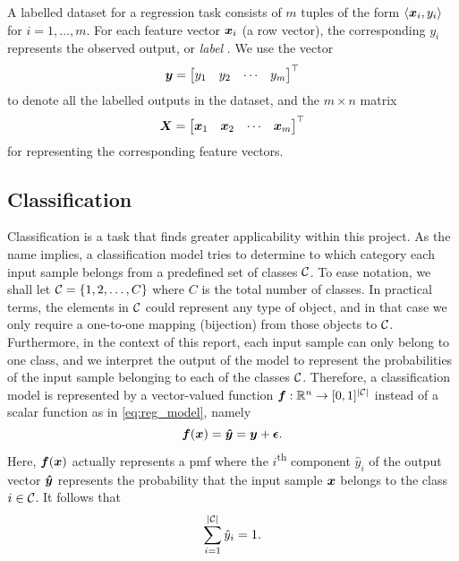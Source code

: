 \documentclass[../report.tex]{subfiles}
\begin{document}
A labelled dataset for a regression task consists of $m$ tuples of the form
$\langle {\bm{x}}_i, y_i\rangle$
for $i=1,\dots,m$.
For each feature vector ${\bm{x}}_i$ (a row vector), the corresponding $y_i$ represents the observed output, or \emph{label} \cite{burkov2019}.
We use the vector
\begin{equation}
    \label{eq:sup_learn_target}
    {\bm{y}} = \begin{bmatrix}
        y_1 & y_2 & \cdots & y_m
    \end{bmatrix}^\top
\end{equation}
to denote all the labelled outputs in the dataset, and the $m \times n$ matrix
\begin{equation}
    \label{eq:sup_learn_input_matrix}
    {\bm{X}} = \begin{bmatrix}
        {\bm{x}}_1 & {\bm{x}}_2 & \cdots & {\bm{x}}_m
    \end{bmatrix}^\top
\end{equation}
for representing the corresponding feature vectors.

\subsection{Classification}
\label{sec:background_classification}
Classification is a task that finds greater applicability within this project.
As the name implies, a classification model tries to determine to which category each input sample belongs from a predefined set of classes ${\mathcal{C}}$.
To ease notation, we shall let ${\mathcal{C}}=\{1, 2, \dots, C\}$ where $C$ is the total number of classes.
In practical terms, the elements in ${\mathcal{C}}$ could represent any type of object, and in that case we only require a one-to-one mapping (bijection) from those objects to ${\mathcal{C}}$.
Furthermore, in the context of this report, each input sample can only belong to one class, and we interpret the output of the model to represent the probabilities of the input sample belonging to each of the classes ${\mathcal{C}}$.
Therefore, a classification model is represented by a vector-valued function
${\bm{f}} : \mathbb{R}^n \rightarrow [0,1]^{\lvert{\mathcal{C}}\rvert}$
instead of a scalar function as in \cref{eq:reg_model}, namely
\begin{equation}
    \label{eq:cla_model}
    {\bm{f}}({\bm{x}}) = {\bm{\hat{y}}} = {\bm{y}} + \bm{\epsilon}.
\end{equation}
Here, ${\bm{f}}({\bm{x}})$ actually represents a \gls{pmf} where the $i$\textsuperscript{th} component $\hat{y}_i$ of the output vector ${\bm{\hat{y}}}$ represents the probability that the input sample ${\bm{x}}$ belongs to the class $i\in {\mathcal{C}}$.
It follows that
\begin{equation}
    \label{eq:pmf}
    \sum_{i=1}^{\lvert{\mathcal{C}}\rvert} \hat{y}_i = 1.
\end{equation}
\end{document}
